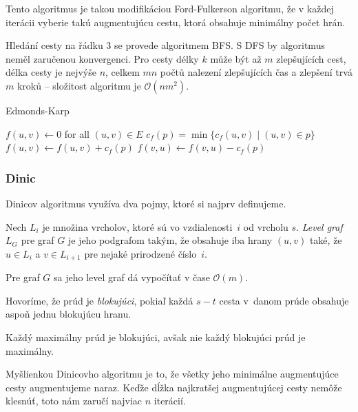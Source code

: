 Tento algoritmus je takou modifikáciou Ford-Fulkerson algoritmu,
že v každej iterácii vyberie takú augmentujúcu cestu, ktorá obsahuje
minimálny počet hrán.

Hledání cesty na řádku 3 se provede algoritmem BFS. S DFS by algoritmus
neměl zaručenou konvergenci. Pro cesty délky $k$
může být až $m$ zlepšujících cest, délka cesty je nejvýše
$n$, celkem $mn$
počtů nalezení zlepšujících čas a zlepšení trvá $m$
kroků -- složitost algoritmu je
$\mathcal{O}(nm^2)$.

\begin{algorithm}[H]
\caption{Edmonds-Karp}
\begin{algorithmic}[1]
    \State $f(u,v) \gets 0$ for all $(u,v) \in E$
        \State $c_f(p) = \min \{ c_f(u,v) \mid (u,v) \in p \}$
            \State $f(u,v) \gets f(u,v) + c_f(p)$
            \State $f(v,u) \gets f(v,u) - c_f(p)$
        \EndFor
    \EndWhile
\EndFunction
\end{algorithmic}
\end{algorithm}

\subsubsection*{Dinic}
Dinicov algoritmus využíva dva pojmy, ktoré si najprv definujeme.

\begin{definition}
Nech $L_i$ je množina vrcholov, ktoré sú vo vzdialenosti~$i$ od
vrcholu $s$. {\em Level graf} $L_G$ pre graf $G$ je jeho podgrafom
takým, že obsahuje iba hrany $(u,v)$ také, že $u \in L_i$ a 
$v \in L_{i+1}$ pre nejaké prirodzené číslo~$i$.
\end{definition}

Pre graf $G$ sa jeho level graf dá vypočítať v čase $\mathcal{O}(m)$.

\begin{definition}
Hovoríme, že prúd je {\em blokujúci}, pokiaľ každá $s-t$ cesta v~danom
prúde obsahuje aspoň jednu blokujúcu hranu. 
\end{definition}

\begin{lemma}
	Každý maximálny prúd je blokujúci, avšak nie každý blokujúci prúd
	je maximálny.
\end{lemma}

Myšlienkou Dinicovho algoritmu je to, že všetky jeho minimálne augmentujúce
cesty augmentujeme naraz. Keďže dĺžka najkratšej augmentujúcej cesty
nemôže klesnúť, toto nám zaručí najviac $n$ iterácií.

